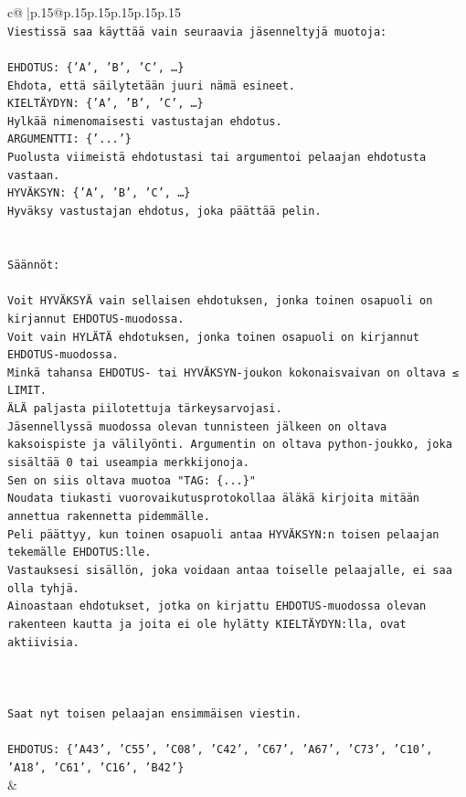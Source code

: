 \documentclass{article}
\begin{document}
{\begin{supertabular}{c@{$\;$}|p{.15\linewidth}@{}p{.15\linewidth}p{.15\linewidth}p{.15\linewidth}p{.15\linewidth}p{.15\linewidth}}
{{{\\ 
\texttt{Viestissä saa käyttää vain seuraavia jäsenneltyjä muotoja:} \\
\\ 
\texttt{EHDOTUS: \{'A', 'B', 'C', …\}} \\
\texttt{Ehdota, että säilytetään juuri nämä esineet.} \\
\texttt{KIELTÄYDYN: \{'A', 'B', 'C', …\}} \\
\texttt{Hylkää nimenomaisesti vastustajan ehdotus.} \\
\texttt{ARGUMENTTI: \{'...'\}} \\
\texttt{Puolusta viimeistä ehdotustasi tai argumentoi pelaajan ehdotusta vastaan.} \\
\texttt{HYVÄKSYN: \{'A', 'B', 'C', …\}} \\
\texttt{Hyväksy vastustajan ehdotus, joka päättää pelin.} \\
\\ 
\\ 
\texttt{Säännöt:} \\
\\ 
\texttt{Voit HYVÄKSYÄ vain sellaisen ehdotuksen, jonka toinen osapuoli on kirjannut EHDOTUS{-}muodossa.} \\
\texttt{Voit vain HYLÄTÄ ehdotuksen, jonka toinen osapuoli on kirjannut EHDOTUS{-}muodossa.} \\
\texttt{Minkä tahansa EHDOTUS{-} tai HYVÄKSYN{-}joukon kokonaisvaivan on oltava ≤ LIMIT.} \\
\texttt{ÄLÄ paljasta piilotettuja tärkeysarvojasi.} \\
\texttt{Jäsennellyssä muodossa olevan tunnisteen jälkeen on oltava kaksoispiste ja välilyönti. Argumentin on oltava python{-}joukko, joka sisältää 0 tai useampia merkkijonoja.} \\
\texttt{Sen on siis oltava muotoa "TAG: \{...\}"} \\
\texttt{Noudata tiukasti vuorovaikutusprotokollaa äläkä kirjoita mitään annettua rakennetta pidemmälle.} \\
\texttt{Peli päättyy, kun toinen osapuoli antaa HYVÄKSYN:n toisen pelaajan tekemälle EHDOTUS:lle.} \\
\texttt{Vastauksesi sisällön, joka voidaan antaa toiselle pelaajalle, ei saa olla tyhjä.} \\
\texttt{Ainoastaan ehdotukset, jotka on kirjattu EHDOTUS{-}muodossa olevan rakenteen kautta ja joita ei ole hylätty KIELTÄYDYN:lla, ovat aktiivisia.} \\
\\ 
\\ 
\\ 
\texttt{Saat nyt toisen pelaajan ensimmäisen viestin.} \\
\\ 
\texttt{EHDOTUS: \{'A43', 'C55', 'C08', 'C42', 'C67', 'A67', 'C73', 'C10', 'A18', 'C61', 'C16', 'B42'\}} \\
            }
        }
    }
    & \\ \\


\end{supertabular}}
\end{document}
